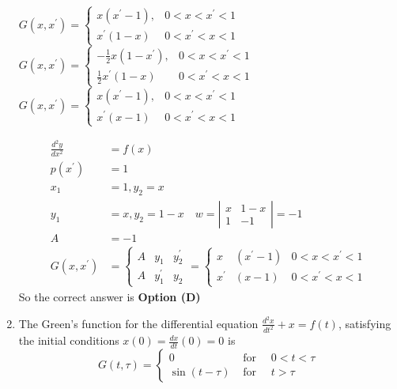 \begin{enumerate}[label=\color{ocre}\textbf{\arabic*.}]
\begin{tasks}
		\task[\textbf{B.}] $G\left(x, x^{\prime}\right)=\left\{\begin{array}{ll}x\left(x^{\prime}-1\right), & 0<x<x^{\prime}<1 \\ x^{\prime}(1-x) & 0<x^{\prime}<x<1\end{array}\right.$
		\task[\textbf{C.}] $G\left(x, x^{\prime}\right)=\left\{\begin{array}{ll}-\frac{1}{2} x\left(1-x^{\prime}\right), & 0<x<x^{\prime}<1 \\ \frac{1}{2} x^{\prime}(1-x) & 0<x^{\prime}<x<1\end{array}\right.$
		\task[\textbf{D.}]  $G\left(x, x^{\prime}\right)=\left\{\begin{array}{ll}x\left(x^{\prime}-1\right), & 0<x<x^{\prime}<1 \\ x^{\prime}(x-1) & 0<x^{\prime}<x<1\end{array}\right.$
	\end{tasks}
	\begin{answer}
		\begin{align*}
		\frac{d^{2} y}{d x^{2}}&=f(x)\\
		p\left(x^{\prime}\right)&=1\\
		x_{1}&=1, y_{2}=x\\
		y_{1}&=x, y_{2}=1-x \quad w=\left|\begin{array}{cc}x & 1-x \\ 1 & -1\end{array}\right|=-1\\
		A&=-1\\
		G\left(x, x^{\prime}\right)&=\left\{\begin{array}{lll}A & y_{1} & y_{2}^{\prime} \\ A & y_{1}^{\prime} & y_{2}\end{array}=\left\{\begin{array}{lll}x & \left(x^{\prime}-1\right) & 0<x<x^{\prime}<1 \\ x^{\prime} & (x-1) & 0<x^{\prime}<x<1\end{array}\right.\right.
		\end{align*}
		So the correct answer is \textbf{Option (D)}
	\end{answer}
	\item  The Green's function for the differential equation $\frac{d^{2} x}{d t^{2}}+x=f(t)$, satisfying the initial conditions $x(0)=\frac{d x}{d t}(0)=0$ is\\
	$$G(t, \tau)=\left\{\begin{array}{ll}0 & \text { for } \quad 0<t<\tau \\ \sin (t-\tau) & \text { for } \quad t>\tau\end{array}\right.$$\\

\end{enumerate}
